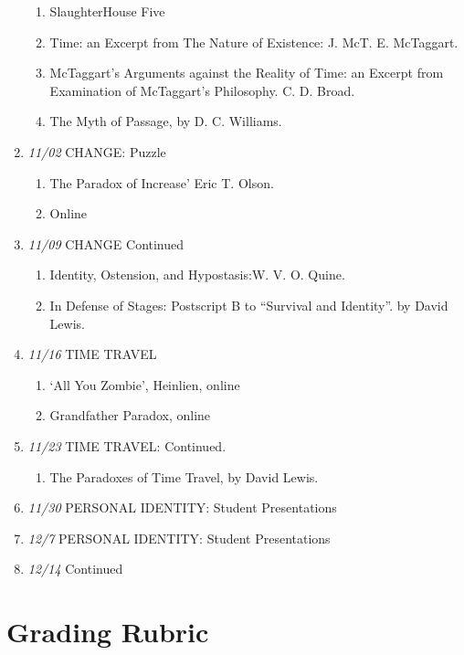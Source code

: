 \documentclass[11pt,article,oneside]{memoir}
\begin{document}
\begin{enumerate}
\begin{enumerate}
\item SlaughterHouse Five
\item Time: an Excerpt from The Nature of Existence: J. McT. E. McTaggart.
\item McTaggart’s Arguments against the Reality of Time: an Excerpt from Examination of McTaggart’s Philosophy. C. D. Broad.
\item The Myth of Passage, by D. C. Williams.
\end{enumerate}
\item \textit{11/02} CHANGE: Puzzle
\begin{enumerate}
\item The Paradox of Increase' Eric T. Olson.
\item Online
\end{enumerate}
\item \textit{11/09} CHANGE Continued 
\begin{enumerate}
 \item Identity, Ostension, and Hypostasis:W. V. O. Quine.
\item In Defense of Stages: Postscript B to “Survival and Identity”. by David Lewis.
\end{enumerate}
\item \textit{11/16} TIME TRAVEL
\begin{enumerate}
\item `All You Zombie', Heinlien, online 
\item Grandfather Paradox, online
\end{enumerate}
\item \textit{11/23} TIME TRAVEL: Continued.
\begin{enumerate}
\item The Paradoxes of Time Travel, by David Lewis.
\end{enumerate}
\item \textit{11/30} PERSONAL IDENTITY: Student Presentations
\item \textit{12/7} PERSONAL IDENTITY: Student Presentations
\item \textit{12/14} Continued
\end{enumerate}

\newpage
\section{Grading Rubric}
\end{document}
